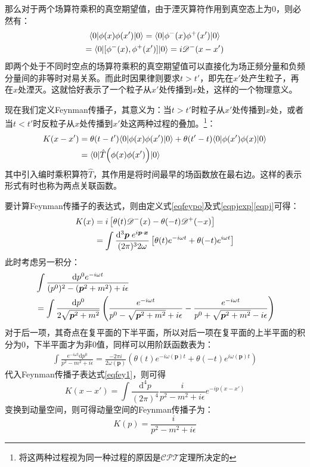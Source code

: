 那么对于两个场算符乘积的真空期望值，由于湮灭算符作用到真空态上为0，则必然有：
\begin{gather}
\langle 0|\phi(x)\phi(x')|0\rangle=	\langle 0|\phi^-(x)\phi^+(x')|0\rangle\notag\\
=\langle 0|[\phi^-(x),\phi^+(x')]|0\rangle=i\mathscr{D}^-(x-x')\label{eqpjexp}
\end{gather}
即两个处于不同时空点的场算符乘积的真空期望值可以直接化为场正频分量和负频分量间的非等时对易关系。而此时因果律则要求$t>t'$，即先在$x'$处产生粒子，再在$x$处湮灭。这就恰好表示了一个粒子从$x'$处传播到$x$处，这样的一个物理意义。

现在我们定义Feynman传播子，其意义为：当$t>t'$时粒子从$x'$处传播到$x$处，或者当$t<t'$时反粒子从$x$处传播到$x'$处这两种过程的叠加。\footnote{将这两种过程视为同一种过程的原因是$\mathcal{CPT}$定理所决定的}：
\begin{align}
K(x-x')&=\theta(t-t')\langle 0|\phi(x)\phi(x')|0\rangle+\theta(t'-t)\langle 0|\phi(x')\phi(x)|0\rangle\notag\\
&=\langle 0|\hat{T}\Big(\phi(x)\phi(x')\Big)|0\rangle
\label{eqfeypo}
\end{align}
其中引入编时乘积算符$\hat{T}$，其作用是将时间最早的场函数放在最右边。这样的表示形式有时也称为两点关联函数。

要计算Feynman传播子的表达式，则由定义式\eqref{eqfeypo}及式\eqref{eqpjexp}\eqref{eqpj}可得：
\begin{align}
K(x)&=i\left[\theta(t)\mathscr{D}^-(x)-\theta(-t)\mathscr{D}^+(-x)\right]\notag\\
&=\int\frac{\mathrm{d}^3\boldsymbol{p}\;e^{i\boldsymbol{p}\cdot\boldsymbol{x}}}{(2\pi)^3 2\omega}\left[\theta(t)e^{-i\omega t}+\theta(-t)e^{i\omega t}\right]
\label{eqfey1}
\end{align}
此时考虑另一积分：
\begin{align}
&\int\frac{\mathrm{d}p^0 e^{-i\omega t}}{(p^0)^2-(\boldsymbol{p}^2+m^2)+i\epsilon}\notag\\
&=\int\frac{\mathrm{d}p^0}{2\sqrt{\boldsymbol{p}^2+m^2}}\left(\frac{e^{-i\omega t}}{p^0-\sqrt{\boldsymbol{p}^2+m^2}+i\epsilon}-\frac{e^{-i\omega t}}{p^0+\sqrt{\boldsymbol{p}^2+m^2}-i\epsilon}\right)
\end{align}
对于后一项，其奇点在复平面的下半平面，所以对后一项在复平面的上半平面的积分为0，下半平面才为非0值，同样可以用阶跃函数表为：
\begin{align}
\int\frac{e^{-i\omega t}\mathrm{d}p^0}{p^2-m^2+i\epsilon}=\frac{-2\pi i}{2\omega(\boldsymbol{p})}\left(\theta(t)e^{-i\omega(\boldsymbol{p})t}+\theta(-t)e^{i\omega(\boldsymbol{p})t}\right)
\end{align}
代入Feynman传播子表达式\eqref{eqfey1}，则可得
\begin{equation}
K(x-x')=\int\frac{\mathrm{d}^4p}{(2\pi)^4}\frac{i}{p^2-m^2+i\epsilon}e^{-ip(x-x')}
\end{equation}
变换到动量空间，则可得动量空间的Feynman传播子为：
\begin{equation}
K(p)=\frac{i}{p^2-m^2+i\epsilon}
\end{equation}

